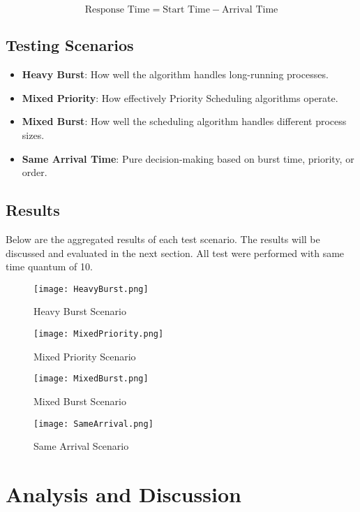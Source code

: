 \documentclass[conference]{report}
\begin{document}
\[
\text{Response Time} = \text{Start Time} - \text{Arrival Time}
\]

\section*{Testing Scenarios}
\begin{itemize}
    \item \textbf{Heavy Burst}: How well the algorithm handles long-running processes.
    \item \textbf{Mixed Priority}: How effectively Priority Scheduling algorithms operate.
    \item \textbf{Mixed Burst}: How well the scheduling algorithm handles different process sizes.
    \item \textbf{Same Arrival Time}: Pure decision-making based on burst time, priority, or order.
\end{itemize}

\section*{Results}
Below are the aggregated results of each test scenario. The results will be discussed and evaluated in the next section. All test were performed with same time quantum of 10.

\begin{figure}
    \centering
    \texttt{[image: HeavyBurst.png]}
    \caption{Heavy Burst Scenario}
    \label{fig:enter-label}
\end{figure}
\begin{figure}
    \centering
    \texttt{[image: MixedPriority.png]}
    \caption{Mixed Priority Scenario}
    \label{fig:enter-label}
\end{figure}
\begin{figure}
    \centering
    \texttt{[image: MixedBurst.png]}
    \caption{Mixed Burst Scenario}
    \label{fig:enter-label}
\end{figure}
\begin{figure}
    \centering
    \texttt{[image: SameArrival.png]}
    \caption{Same Arrival Scenario}
    \label{fig:enter-label}
\end{figure}

\chapter{Analysis and Discussion}
\end{document}
